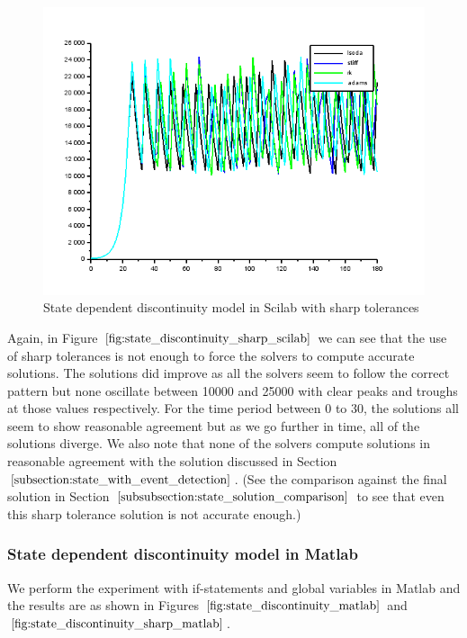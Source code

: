 \begin{figure}[h]
\centering
\includegraphics[width=0.7\linewidth]{./figures/state_discontinuity_sharp_sci}
\caption{State dependent discontinuity model in Scilab with sharp tolerances}
\label{fig:state_discontinuity_sharp_scilab}
\end{figure}

Again, in Figure $\ref{fig:state_discontinuity_sharp_scilab}$ we can see that the use of sharp tolerances is not enough to force the solvers to compute accurate solutions. The solutions did improve as all the solvers seem to follow the correct pattern but none oscillate between 10000 and 25000 with clear peaks and troughs at those values respectively. For the time period between 0 to 30, the solutions all seem to show reasonable agreement but as we go further in time, all of the solutions diverge. We also note that none of the solvers compute solutions in reasonable agreement with the solution discussed in Section $\ref{subsection:state_with_event_detection}$. (See the comparison against the final solution in Section $\ref{subsubsection:state_solution_comparison}$ to see that even this sharp tolerance solution is not accurate enough.)


\subsubsection{State dependent discontinuity model in Matlab}
We perform the experiment with if-statements and global variables in Matlab and the results are as shown in Figures $\ref{fig:state_discontinuity_matlab}$ and $\ref{fig:state_discontinuity_sharp_matlab}$.

